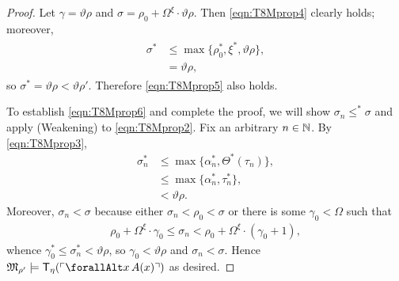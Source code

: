 \documentclass[UKenglish,cleveref,DIV=12]{scrartcl}
\let\forall\forallAlt
\theoremstyle{definition}
\theoremstyle{definition}
\begin{document}
\begin{proof}
Let $\gamma=\vartheta\rho$ and
  $\sigma=\rho_0+\Omega^\xi\cdot\vartheta\rho$.
%
Then \cref{eqn:T8Mprop4} clearly holds; moreover,
\begin{align}\label{eqn:T8Mprop7}\begin{split}
  \sigma^*&\le\max\{\rho_0^*,\xi^*,\vartheta\rho\},\\
	&=\vartheta\rho,\end{split}
\end{align}
so $\sigma^*=\vartheta\rho<\vartheta\rho'$. Therefore \cref{eqn:T8Mprop5} also holds.

To establish \cref{eqn:T8Mprop6} and complete the proof, we will show $\sigma_n\le^*\sigma$ and apply (Weakening) to \cref{eqn:T8Mprop2}. Fix an arbitrary $n\in\mathbb N$. By \cref{eqn:T8Mprop3},
\begin{align*}
  \sigma_n^*&\le\max\{\alpha_n^*,\Theta^*(\tau_n)\},\\
	  &\le\max\{\alpha_n^*,\tau_n^*\},\\
	  &<\vartheta\rho.
\end{align*}
Moreover, $\sigma_n<\sigma$ because either $\sigma_n<\rho_0<\sigma$ or there is some $\gamma_0<\Omega$ such that
\begin{align*}
  \rho_0+\Omega^\xi\cdot\gamma_0\le\sigma_n<\rho_0+\Omega^\xi\cdot(\gamma_0+1),
\end{align*}
whence $\gamma_0^*\le\sigma^*_n<\vartheta\rho$, so $\gamma_0<\vartheta\rho$ and $\sigma_n<\sigma$. Hence $\mathfrak M_{\rho'}\models \T_\eta(\gn{\forall x\,A(x)})$ as desired.
\end{proof}
\end{document}
